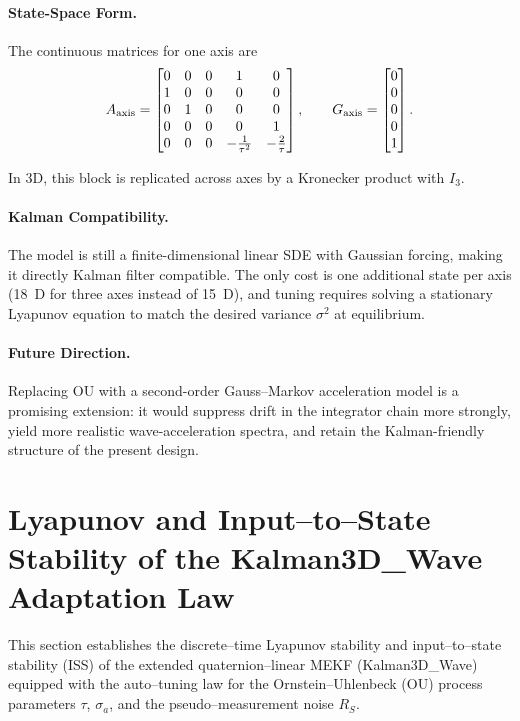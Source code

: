 \documentclass[10pt]{extarticle}
\begin{document}
\paragraph{State-Space Form.}
The continuous matrices for one axis are
\[
A_{\rm axis} =
\begin{bmatrix}
0 & 0 & 0 & 1 & 0 \\
1 & 0 & 0 & 0 & 0 \\
0 & 1 & 0 & 0 & 0 \\
0 & 0 & 0 & 0 & 1 \\
0 & 0 & 0 & -\tfrac{1}{\tau^2} & -\tfrac{2}{\tau}
\end{bmatrix},
\qquad
G_{\rm axis} =
\begin{bmatrix}0\\0\\0\\0\\1\end{bmatrix}.
\]

In 3D, this block is replicated across axes by a Kronecker product with $I_3$.

\paragraph{Kalman Compatibility.}
The model is still a finite-dimensional linear SDE with Gaussian forcing, making it
directly Kalman filter compatible. The only cost is one additional state per axis (18~D for three axes
instead of 15~D), and tuning requires solving a stationary Lyapunov equation to match
the desired variance $\sigma^2$ at equilibrium.

\paragraph{Future Direction.}
Replacing OU with a second-order Gauss--Markov acceleration model is a promising extension:
it would suppress drift in the integrator chain more strongly, yield more realistic
wave-acceleration spectra, and retain the Kalman-friendly structure of the present design.

\section{Lyapunov and Input–to–State Stability of the Kalman3D\_Wave Adaptation Law}
\label{sec:stability}

This section establishes the discrete–time Lyapunov stability and input–to–state stability (ISS)
of the extended quaternion–linear MEKF (Kalman3D\_Wave) equipped with the
auto–tuning law for the Ornstein–Uhlenbeck (OU) process parameters
$\tau$, $\sigma_a$, and the pseudo–measurement noise $R_S$.
\end{document}
